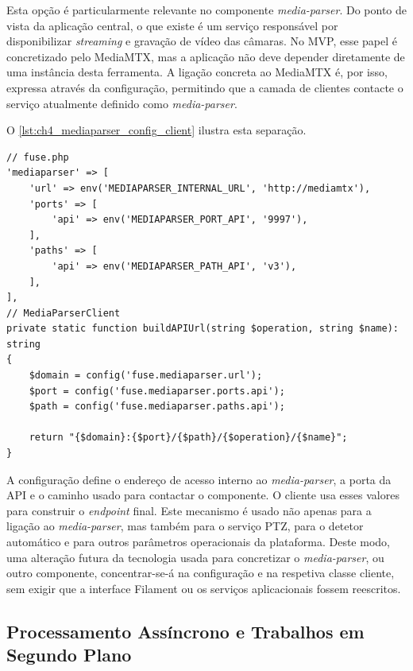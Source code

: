 Esta opção é particularmente relevante no componente \textit{media-parser}. Do ponto de vista da aplicação central, o que existe é um serviço responsável por disponibilizar \textit{streaming} e gravação de vídeo das câmaras. No \gls{MVP}, esse papel é concretizado pelo MediaMTX, mas a aplicação não deve depender diretamente de uma instância desta ferramenta. A ligação concreta ao MediaMTX é, por isso, expressa através da configuração, permitindo que a camada de clientes contacte o serviço atualmente definido como \textit{media-parser}.

O \autoref{lst:ch4_mediaparser_config_client} ilustra esta separação. 

\par\noindent\begin{minipage}{\linewidth}
\begin{lstlisting}[caption={Configuração e construção do \textit{endpoint} do \textit{media-parser} (php)},label={lst:ch4_mediaparser_config_client}]
// fuse.php
'mediaparser' => [
    'url' => env('MEDIAPARSER_INTERNAL_URL', 'http://mediamtx'),
    'ports' => [
        'api' => env('MEDIAPARSER_PORT_API', '9997'),
    ],
    'paths' => [
        'api' => env('MEDIAPARSER_PATH_API', 'v3'),
    ],
],
// MediaParserClient
private static function buildAPIUrl(string $operation, string $name): string
{
    $domain = config('fuse.mediaparser.url');
    $port = config('fuse.mediaparser.ports.api');
    $path = config('fuse.mediaparser.paths.api');

    return "{$domain}:{$port}/{$path}/{$operation}/{$name}";
}
\end{lstlisting}
\end{minipage}

A configuração define o endereço de acesso interno ao \textit{media-parser}, a porta da \gls{API} e o caminho usado para contactar o componente. O cliente usa esses valores para construir o \textit{endpoint} final. Este mecanismo é usado não apenas para a ligação ao \textit{media-parser}, mas também para o serviço PTZ, para o detetor automático e para outros parâmetros operacionais da plataforma. Deste modo, uma alteração futura da tecnologia usada para concretizar o \textit{media-parser}, ou outro componente, concentrar-se-á na configuração e na respetiva classe cliente, sem exigir que a interface Filament ou os serviços aplicacionais fossem reescritos.

\subsection{Processamento Assíncrono e Trabalhos em Segundo Plano}
\label{subsec:processamento_assincrono}

